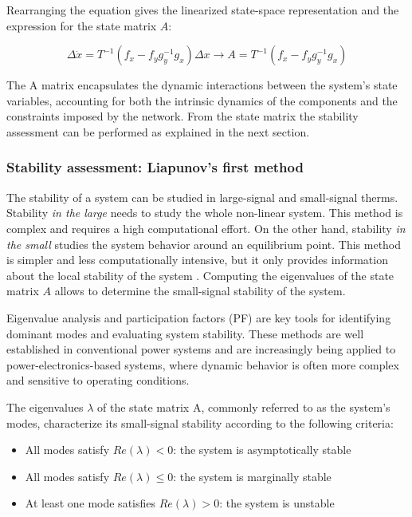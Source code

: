 Rearranging the equation gives the linearized state-space representation and the expression for the state matrix $A$:

\begin{equation}
    \Delta \dot{x} = T^{-1}(f_x-f_yg_y^{-1}g_x) \Delta x  \to A=T^{-1} (f_x-f_yg_y^{-1}g_x) 
\end{equation}


The A matrix encapsulates the dynamic interactions between the system's state variables, accounting for both the intrinsic dynamics of the components and the constraints imposed by the network. 
From the state matrix the stability assessment can be performed as explained in the next section.

\subsubsection{Stability assessment: Liapunov's first method}

The stability of a system can be studied in large-signal and small-signal therms. Stability \textit{in the large} needs to study the whole non-linear system. This method is complex and requires a high
computational effort. On the other hand, stability \textit{in the small} studies the system behavior around an equilibrium point. This method is simpler and less computationally intensive, but it only 
provides information about the local stability of the system \cite{StabilityAndControlKundur}. Computing the eigenvalues of the state matrix $A$ allows to determine the small-signal stability of the system.

Eigenvalue analysis and participation factors (PF) are key tools for identifying dominant modes and evaluating system stability. These methods are well established in conventional 
power systems and are increasingly being applied to power-electronics-based systems, where dynamic behavior is often more complex and sensitive to operating conditions.

The eigenvalues $\lambda$ of the state matrix A, commonly referred to as the system's modes, characterize its small-signal stability according to the following criteria:

\begin{itemize}
  \item All modes satisfy $Re(\lambda) < 0$: the system is asymptotically stable
  \item All modes satisfy $Re(\lambda) \leq 0$: the system is marginally stable
  \item At least one mode satisfies $Re(\lambda) > 0$: the system is unstable
\end{itemize}

